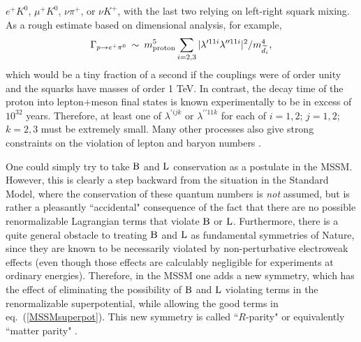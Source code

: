 \documentclass[12pt]{article}
\def\beq{\begin{eqnarray}}
\def\eeq{\end{eqnarray}}
\def\Baryon{{\rm B}}
\def\Lepton{{\rm L}}
\def\stilde{\widetilde}
\begin{document}
$e^+ K^0$, $\mu^+ K^0$, $\nu\pi^+$, or $\nu K^+$, 
with the last two relying on left-right squark mixing.
As a rough estimate based on dimensional analysis, for example,
\beq
\Gamma_{p \rightarrow e^+ \pi^0} \>\sim\> m_{{\rm proton}}^5 \sum_{i=2,3}  
|\lambda^{\prime 11i}\lambda^{\prime\prime 11i}|^2/m_{\stilde d_i}^4,
\eeq
which would be a tiny fraction of a second if the couplings were of order 
unity and the squarks have masses of order 1 TeV.  In contrast, the decay 
time of the proton into lepton+meson final states is known experimentally 
to be in excess of $10^{32}$ years. Therefore, at least one of 
$\lambda^{\prime ijk}$ or $\lambda^{\prime\prime 11k}$ for each of 
$i=1,2$; $j=1,2$; $k=2,3$ must be extremely small. Many other processes 
also give strong constraints on the violation of lepton and baryon 
numbers \cite{rparityconstraints,RPVreviews}.

One could simply try to take $\Baryon$ and $\Lepton$ conservation as a
postulate in the MSSM. However, this is clearly a step backward from the
situation in the Standard Model, where the conservation of these quantum
numbers is {\it not} assumed, but is rather a pleasantly ``accidental"
consequence of the fact that there are no possible renormalizable
Lagrangian terms that violate $\Baryon$ or $\Lepton$. Furthermore, there
is a quite general obstacle to treating $\Baryon$ and $\Lepton$ as
fundamental symmetries of Nature, since they are known to be necessarily
violated by non-perturbative electroweak effects \cite{tHooft} 
(even though those
effects are calculably negligible for experiments at ordinary energies).
Therefore, in the MSSM one adds a new symmetry, which has the effect of
eliminating the possibility of $\Baryon$ and $\Lepton$ violating terms in
the renormalizable superpotential, while allowing the good terms in
eq.~(\ref{MSSMsuperpot}). This new symmetry is called ``$R$-parity"
\cite{Rparity} or equivalently ``matter parity" \cite{matterparity}.
\end{document}
